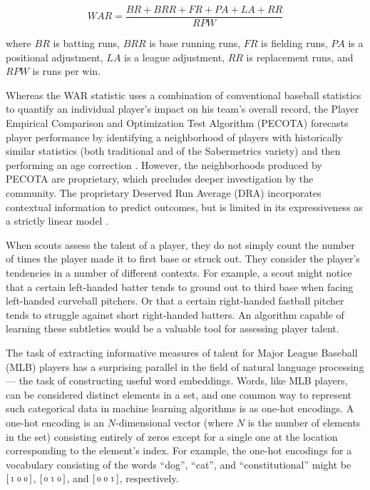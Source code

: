 \documentclass{article}
\begin{document}
\begin{equation}
\label{eqn:war}
WAR = \frac{BR + BRR + FR + PA + LA + RR}{RPW}
\end{equation}

where $BR$ is batting runs, $BRR$ is base running runs, $FR$ is fielding runs, $PA$ is a positional adjustment, $LA$ is a league adjustment, $RR$ is replacement runs, and $RPW$ is runs per win.

Whereas the WAR statistic uses a combination of conventional baseball statistics to quantify an individual player's impact on his team's overall record, the Player Empirical Comparison and Optimization Test Algorithm (PECOTA) forecasts player performance by identifying a neighborhood of players with historically similar statistics (both traditional and of the Sabermetrics variety) and then performing an age correction \parencite{PECOTA}. However, the neighborhoods produced by PECOTA are proprietary, which precludes deeper investigation by the community. The proprietary Deserved Run Average (DRA) incorporates contextual information to predict outcomes, but is limited in its expressiveness as a strictly linear model \parencite{Judge2015, Turkenkopf2015}.

When scouts assess the talent of a player, they do not simply count the number of times the player made it to first base or struck out. They consider the player's tendencies in a number of different contexts. For example, a scout might notice that a certain left-handed batter tends to ground out to third base when facing left-handed curveball pitchers. Or that a certain right-handed fastball pitcher tends to struggle against short right-handed batters. An algorithm capable of learning these subtleties would be a valuable tool for assessing player talent.

The task of extracting informative measures of talent for Major League Baseball (MLB) players has a surprising parallel in the field of natural language processing --- the task of constructing useful word embeddings. Words, like MLB players, can be considered distinct elements in a set, and one common way to represent such categorical data in machine learning algorithms is as one-hot encodings. A one-hot encoding is an $N$-dimensional vector (where $N$ is the number of elements in the set) consisting entirely of zeros except for a single one at the location corresponding to the element's index. For example, the one-hot encodings for a vocabulary consisting of the words ``dog'', ``cat'', and ``constitutional'' might be $\begin{bsmallmatrix} 1 & 0 & 0 \end{bsmallmatrix}$, $\begin{bsmallmatrix} 0 & 1 & 0 \end{bsmallmatrix}$, and $\begin{bsmallmatrix} 0 & 0 & 1 \end{bsmallmatrix}$, respectively.
\end{document}
